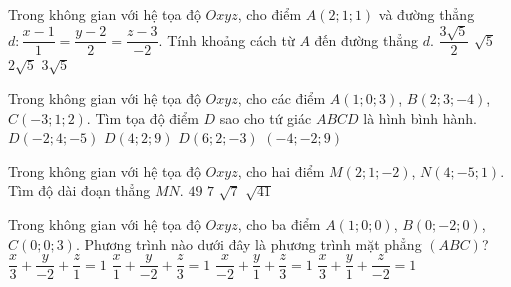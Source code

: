 \begin{ex}%
	Trong không gian với hệ tọa độ $Oxyz$, cho điểm $A(2;1;1)$ và đường thẳng $d \colon \dfrac{x-1}{1}=\dfrac{y-2}{2}=\dfrac{z-3}{-2}$. Tính khoảng cách từ $A$ đến đường thẳng $d$.
	\choice
	{ $\dfrac{3\sqrt{5}}{2} $}
	{\True $\sqrt{5} $}
	{$2\sqrt{5} $}
	{ $3\sqrt{5} $}
\end{ex}

\begin{ex}%
	Trong không gian với hệ tọa độ $Oxyz$, cho các điểm $A(1;0;3)$, $B(2;3;-4)$,$C(-3;1;2)$. Tìm tọa độ điểm $D$ sao cho tứ giác $ABCD$ là hình bình hành.
	\choice
	{$D(-2;4;-5) $}
	{$D(4;2;9) $}
	{$D(6;2;-3) $}
	{\True $(-4;-2;9) $}
\end{ex}

\begin{ex}%
	Trong không gian với hệ tọa độ $Oxyz$, cho hai điểm $M(2;1;-2)$, $N(4;-5;1)$. Tìm độ dài đoạn thẳng $MN$.
	\choice
	{$49 $}
	{\True $7 $}
	{$\sqrt{7} $}
	{ $\sqrt{41} $}
\end{ex}

\begin{ex}%
	Trong không gian với hệ tọa độ $Oxyz$, cho ba điểm $A(1;0;0)$, $B(0;-2;0)$,$C(0;0;3)$. Phương trình nào dưới đây là phương trình mặt phẳng $(ABC)$?
	\choice
	{$\dfrac{x}{3}+\dfrac{y}{-2}+\dfrac{z}{1}=1 $}
	{\True $\dfrac{x}{1}+\dfrac{y}{-2}+\dfrac{z}{3}=1  $}
	{$\dfrac{x}{-2}+\dfrac{y}{1}+\dfrac{z}{3}=1  $}
	{ $\dfrac{x}{3}+\dfrac{y}{1}+\dfrac{z}{-2}=1  $}
\end{ex}

